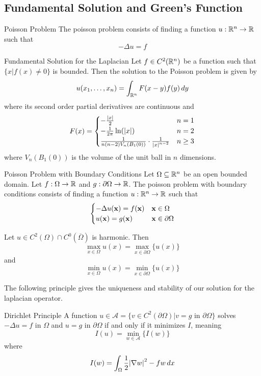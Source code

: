 \documentclass[a4paper]{article}
\begin{document}
\subsection{Fundamental Solution and Green's Function}
\begin{defn}{Poisson Problem}{} The poisson problem consists of finding a function $u:\mathbb{R}^n\to\mathbb{R}$ such that $$-\Delta u=f$$
\end{defn}

\begin{thm}{Fundamental Solution for the Laplacian}{} Let $f\in C^2(\mathbb{R}^n)$ be a function such that $\{x|f(x)\neq 0\}$ is bounded. Then the solution to the Poisson problem is given by $$u(x_1,\dots,x_n)=\int_{\mathbb{R}^n}F(x-y)f(y)\,dy$$ where its second order partial derivatives are continuous and $$F(x)=\begin{cases}
-\frac{\abs{x}}{2} & n=1\\
-\frac{1}{2\pi}\ln(\abs{x}) & n=2\\
\frac{1}{n(n-2)V_n(B_1(0))}\cdot\frac{1}{\abs{x}^{n-2}} & n\geq 3
\end{cases}$$ where $V_n(B_1(0))$ is the volume of the unit ball in $n$ dimensions. 
\end{thm}

\begin{defn}{Poisson Problem with Boundary Conditions}{} Let $\Omega\subseteq\mathbb{R}^n$ be an open bounded domain. Let $f:\Omega\to\mathbb{R}$ and $g:\partial\Omega\to\mathbb{R}$. The poisson problem with boundary conditions consists of finding a function $u:\mathbb{R}^n\to\mathbb{R}$ such that $$\begin{cases}
-\Delta u(\vb{x})=f(\vb{x}) & \vb{x}\in\Omega\\
u(\vb{x})=g(\vb{x}) & \vb{x}\in\partial\Omega
\end{cases}$$
\end{defn}

\begin{thm}{}{} Let $u\in C^2(\Omega)\cap C^0(\overline{\Omega})$ is harmonic. Then $$\max_{x\in\Omega}u(x)=\max_{x\in\partial\Omega}\{u(x)\}$$ and $$\min_{x\in\Omega}u(x)=\min_{x\in\partial\Omega}\{u(x)\}$$
\end{thm}

The following principle gives the uniqueness and stability of our solution for the laplacian operator. 

\begin{thm}{Dirichlet Principle}{} A function $u\in\mathcal{A}=\{v\in C^2(\partial\Omega)|v=g \text{ in }\partial\Omega\}$ solves $-\Delta u=f$ in $\Omega$ and $u=g$ in $\partial\Omega$ if and only if it minimizes $I$, meaning $$I(u)=\min_{w\in\mathcal{A}}\{I(w)\}$$ where $$I(w)=\int_{\Omega}\frac{1}{2}\abs{\nabla w}^2-fw\,dx$$
\end{thm}
\end{document}
